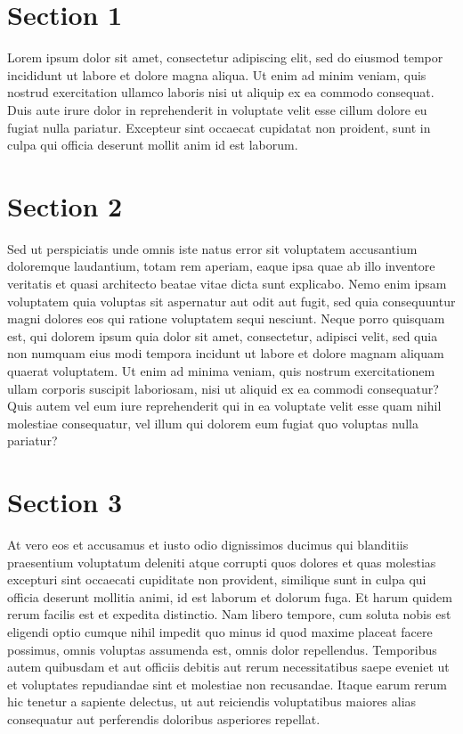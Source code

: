 \documentclass[
]{book}
\begin{document}
\hypertarget{section-1-1}{%
\section{Section 1}\label{section-1-1}}

Lorem ipsum dolor sit amet, consectetur adipiscing elit, sed do eiusmod tempor incididunt ut labore et dolore magna aliqua. Ut enim ad minim veniam, quis nostrud exercitation ullamco laboris nisi ut aliquip ex ea commodo consequat. Duis aute irure dolor in reprehenderit in voluptate velit esse cillum dolore eu fugiat nulla pariatur. Excepteur sint occaecat cupidatat non proident, sunt in culpa qui officia deserunt mollit anim id est laborum.

\hypertarget{section-2-1}{%
\section{Section 2}\label{section-2-1}}

Sed ut perspiciatis unde omnis iste natus error sit voluptatem accusantium doloremque laudantium, totam rem aperiam, eaque ipsa quae ab illo inventore veritatis et quasi architecto beatae vitae dicta sunt explicabo. Nemo enim ipsam voluptatem quia voluptas sit aspernatur aut odit aut fugit, sed quia consequuntur magni dolores eos qui ratione voluptatem sequi nesciunt. Neque porro quisquam est, qui dolorem ipsum quia dolor sit amet, consectetur, adipisci velit, sed quia non numquam eius modi tempora incidunt ut labore et dolore magnam aliquam quaerat voluptatem. Ut enim ad minima veniam, quis nostrum exercitationem ullam corporis suscipit laboriosam, nisi ut aliquid ex ea commodi consequatur? Quis autem vel eum iure reprehenderit qui in ea voluptate velit esse quam nihil molestiae consequatur, vel illum qui dolorem eum fugiat quo voluptas nulla pariatur?

\hypertarget{section-3-1}{%
\section{Section 3}\label{section-3-1}}

At vero eos et accusamus et iusto odio dignissimos ducimus qui blanditiis praesentium voluptatum deleniti atque corrupti quos dolores et quas molestias excepturi sint occaecati cupiditate non provident, similique sunt in culpa qui officia deserunt mollitia animi, id est laborum et dolorum fuga. Et harum quidem rerum facilis est et expedita distinctio. Nam libero tempore, cum soluta nobis est eligendi optio cumque nihil impedit quo minus id quod maxime placeat facere possimus, omnis voluptas assumenda est, omnis dolor repellendus. Temporibus autem quibusdam et aut officiis debitis aut rerum necessitatibus saepe eveniet ut et voluptates repudiandae sint et molestiae non recusandae. Itaque earum rerum hic tenetur a sapiente delectus, ut aut reiciendis voluptatibus maiores alias consequatur aut perferendis doloribus asperiores repellat.
\end{document}
